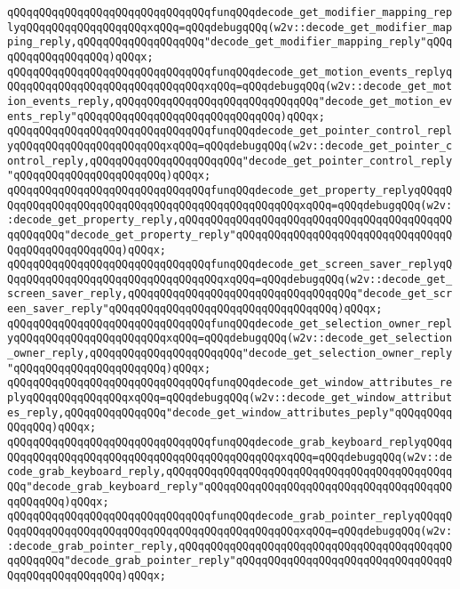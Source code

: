 \verb|qQQqqQQqqQQqqQQqqQQqqQQqqQQqqQQqfunqQQqdecode_get_modifier_mapping_replyqQQqqQQqqQQqqQQqqQQqxqQQq=qQQqdebugqQQq(w2v::decode_get_modifier_mapping_reply,qQQqqQQqqQQqqQQqqQQq"decode_get_modifier_mapping_reply"qQQqqQQqqQQqqQQqqQQq)qQQqx;|\newline
\verb|qQQqqQQqqQQqqQQqqQQqqQQqqQQqqQQqfunqQQqdecode_get_motion_events_replyqQQqqQQqqQQqqQQqqQQqqQQqqQQqqQQqxqQQq=qQQqdebugqQQq(w2v::decode_get_motion_events_reply,qQQqqQQqqQQqqQQqqQQqqQQqqQQqqQQq"decode_get_motion_events_reply"qQQqqQQqqQQqqQQqqQQqqQQqqQQqqQQq)qQQqx;|\newline
\verb|qQQqqQQqqQQqqQQqqQQqqQQqqQQqqQQqfunqQQqdecode_get_pointer_control_replyqQQqqQQqqQQqqQQqqQQqqQQqxqQQq=qQQqdebugqQQq(w2v::decode_get_pointer_control_reply,qQQqqQQqqQQqqQQqqQQqqQQq"decode_get_pointer_control_reply"qQQqqQQqqQQqqQQqqQQqqQQq)qQQqx;|\newline
\verb|qQQqqQQqqQQqqQQqqQQqqQQqqQQqqQQqfunqQQqdecode_get_property_replyqQQqqQQqqQQqqQQqqQQqqQQqqQQqqQQqqQQqqQQqqQQqqQQqqQQqxqQQq=qQQqdebugqQQq(w2v::decode_get_property_reply,qQQqqQQqqQQqqQQqqQQqqQQqqQQqqQQqqQQqqQQqqQQqqQQqqQQq"decode_get_property_reply"qQQqqQQqqQQqqQQqqQQqqQQqqQQqqQQqqQQqqQQqqQQqqQQqqQQq)qQQqx;|\newline
\verb|qQQqqQQqqQQqqQQqqQQqqQQqqQQqqQQqfunqQQqdecode_get_screen_saver_replyqQQqqQQqqQQqqQQqqQQqqQQqqQQqqQQqqQQqxqQQq=qQQqdebugqQQq(w2v::decode_get_screen_saver_reply,qQQqqQQqqQQqqQQqqQQqqQQqqQQqqQQqqQQq"decode_get_screen_saver_reply"qQQqqQQqqQQqqQQqqQQqqQQqqQQqqQQqqQQq)qQQqx;|\newline
\verb|qQQqqQQqqQQqqQQqqQQqqQQqqQQqqQQqfunqQQqdecode_get_selection_owner_replyqQQqqQQqqQQqqQQqqQQqqQQqxqQQq=qQQqdebugqQQq(w2v::decode_get_selection_owner_reply,qQQqqQQqqQQqqQQqqQQqqQQq"decode_get_selection_owner_reply"qQQqqQQqqQQqqQQqqQQqqQQq)qQQqx;|\newline
\verb|qQQqqQQqqQQqqQQqqQQqqQQqqQQqqQQqfunqQQqdecode_get_window_attributes_replyqQQqqQQqqQQqqQQqxqQQq=qQQqdebugqQQq(w2v::decode_get_window_attributes_reply,qQQqqQQqqQQqqQQq"decode_get_window_attributes_peply"qQQqqQQqqQQqqQQq)qQQqx;|\newline
\verb|qQQqqQQqqQQqqQQqqQQqqQQqqQQqqQQqfunqQQqdecode_grab_keyboard_replyqQQqqQQqqQQqqQQqqQQqqQQqqQQqqQQqqQQqqQQqqQQqqQQqxqQQq=qQQqdebugqQQq(w2v::decode_grab_keyboard_reply,qQQqqQQqqQQqqQQqqQQqqQQqqQQqqQQqqQQqqQQqqQQqqQQq"decode_grab_keyboard_reply"qQQqqQQqqQQqqQQqqQQqqQQqqQQqqQQqqQQqqQQqqQQqqQQq)qQQqx;|\newline
\verb|qQQqqQQqqQQqqQQqqQQqqQQqqQQqqQQqfunqQQqdecode_grab_pointer_replyqQQqqQQqqQQqqQQqqQQqqQQqqQQqqQQqqQQqqQQqqQQqqQQqqQQqxqQQq=qQQqdebugqQQq(w2v::decode_grab_pointer_reply,qQQqqQQqqQQqqQQqqQQqqQQqqQQqqQQqqQQqqQQqqQQqqQQqqQQq"decode_grab_pointer_reply"qQQqqQQqqQQqqQQqqQQqqQQqqQQqqQQqqQQqqQQqqQQqqQQqqQQq)qQQqx;|\newline

